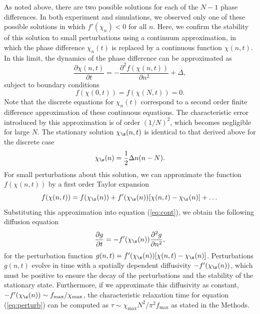 \begin{appendices}
As noted above, there are two possible solutions for each of the $N-1$ phase differences.  In both experiment and simulations, we observed only one of these possible solutions in which $f'(\chi_n)<0$ for all $n$.  Here, we confirm the stability of this solution to small perturbations using a continuum approximation, in which the phase difference $\chi_n(t)$ is replaced by a continuous function $\chi(n,t)$. In this limit, the dynamics of the phase difference can be approximated as
\begin{equation}
    \frac{\partial \chi(n,t)}{\partial t} = -\frac{\partial^2 f(\chi(n,t))}{\partial n^2}  + \Delta, \label{eq:cont}
\end{equation}
subject to boundary conditions 
\begin{equation}
    f(\chi(0,t)) = f(\chi(N,t)) = 0.
\end{equation}
Note that the discrete equations for $\chi_n(t)$ correspond to a second order finite difference approximation of these continuous equations. The characteristic error introduced by this approximation is of order $(1/N)^2$, which becomes negligible for large $N$. The stationary solution $\chi_{\s}(n,t)$ is identical to that derived above for the discrete case
\begin{equation}
    \chi_{\s}(n) = \frac{1}{2} \Delta n(n-N).
\end{equation}
For small perturbations about this solution, we can approximate the function $f(\chi(n,t))$ by a first order Taylor expansion
\begin{equation}
    f(\chi(n,t)) = f(\chi_{\s}(n)) + f'(\chi_{\s}(n))[\chi(n,t)-\chi_{\s}(n)] + \dots
\end{equation}
Substituting this approximation into equation  (\ref{eq:cont}), we obtain the following diffusion equation
\begin{equation}
    \frac{\partial g}{\partial t} = -f'(\chi_{\s}(n)) \frac{\partial^2 g}{\partial n^2}, \label{eq:perturb}
\end{equation}
for the perturbation function $g(n,t)= f'(\chi_{\s}(n))[\chi(n,t)-\chi_{\s}(n)]$. Perturbations $g(n,t)$ evolve in time with a spatially dependent diffusivity $-f'(\chi_{\s}(n))$, which must be positive to ensure the decay of the perturbations and the stability of the stationary state.  Furthermore, if we approximate this diffusivity as constant, $-f'(\chi_{\s}(n))\sim f_{\max} / \chi_{\max}$, the characteristic relaxation time for equation (\ref{eq:perturb}) can be computed as $\tau \sim \chi_{\max} N^2 / \pi^2 f_{\max}$ as stated in the Methods.




\end{appendices}